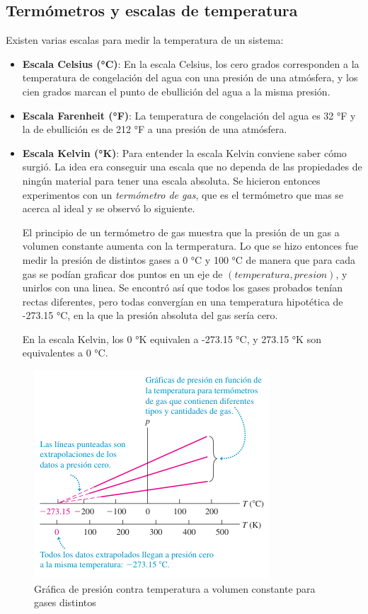 \documentclass[12pt]{article}
\begin{document}
  \subsection{Termómetros y escalas de temperatura}
  Existen varias escalas para medir la temperatura de un sistema:
  \begin{itemize}
    \item \textbf{Escala Celsius (°C)}: En la escala Celsius, los cero grados corresponden a la temperatura de congelación del agua con una presión de una atmósfera, y los cien grados marcan el punto de ebullición del agua a la misma presión.


    \item \textbf{Escala Farenheit (°F)}: La temperatura de congelación del agua es 32 °F y la de ebullición es de 212 °F a una presión de una atmósfera.

    \item \textbf{Escala Kelvin (°K)}: Para entender la escala Kelvin conviene saber cómo surgió. La idea era conseguir una escala que no dependa de las propiedades de ningún material para tener una escala absoluta. Se hicieron entonces experimentos con un \textit{termómetro de gas}, que es el termómetro que mas se acerca al ideal y se observó lo siguiente.

      El principio de un termómetro de gas muestra que la presión de un gas a volumen constante aumenta con la termperatura. Lo que se hizo entonces fue medir la presión de distintos gases a 0 °C y 100 °C de manera que para cada gas se podían graficar dos puntos en un eje de $ (temperatura, presion) $, y unirlos con una linea. Se encontró así que todos los gases probados tenían rectas diferentes, pero todas convergían en una temperatura hipotética de -273.15 °C, en la que la presión absoluta del gas sería cero. 

      En la escala Kelvin, los 0 °K equivalen a -273.15 °C, y 273.15 °K son equivalentes a 0 °C.
  \end{itemize}

  \begin{figure}[H]
    \centering
    \includegraphics[width=0.5\linewidth]{imagenes/escala-Kelvin.png}
    \caption{Gráfica de presión contra temperatura a volumen constante para gases distintos}
    \label{fig:escala-kelvin}
  \end{figure}
  
\end{document}
